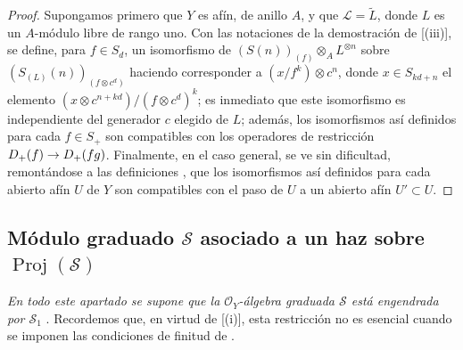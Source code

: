 \documentclass[oneside,10pt]{amsart}
\makeatletter
\newcommand{\ega@arrow}[2]{\mathchoice{#1}{#2}{#2}{#2}}
\renewcommand{\to}{\ega@arrow{\longrightarrow}{\rightarrow}}
\let\EGAOriginalLabel\label
\renewcommand{\label}[1]{\phantomsection\EGAOriginalLabel{#1}}
\makeatother
\begin{document}
\begin{proof}
Supongamos primero que $Y$ es afín, de anillo $A$, y que $\mathcal{L}=\widetilde{L}$, donde $L$ es un $A$-módulo libre de rango uno.
Con las notaciones de la demostración de [(iii)], se define, para $f\in S_d$, un isomorfismo de $(S(n))_{(f)}\otimes_A L^{\otimes n}$ sobre $(S_{(L)}(n))_{(f\otimes c^d)}$ haciendo corresponder a $(x/f^k)\otimes c^n$, donde $x\in S_{kd+n}$ el elemento $(x\otimes c^{n+kd})/(f\otimes c^d)^k$; es inmediato que este isomorfismo es independiente del generador $c$ elegido de $L$; además, los isomorfismos así definidos para cada $f\in S_+$ son compatibles con los operadores de restricción $D_+(f)\to D_+(fg)$.
Finalmente, en el caso general, se ve sin dificultad, remontándose a las definiciones , que los isomorfismos así definidos para cada abierto afín $U$ de $Y$ son compatibles con el paso de $U$ a un abierto afín $U'\subset U$.
\end{proof}

\subsection{Módulo graduado $\mathcal{S}$ asociado a un haz sobre $\operatorname{Proj}(\mathcal{S})$}
\label{subsection:II.3.3-fr}

\emph{En todo este apartado se supone que la $\mathcal{O}_Y$-álgebra graduada $\mathcal{S}$ está engendrada por $\mathcal{S}_1$} .
Recordemos que, en virtud de [(i)], esta restricción no es esencial cuando se imponen las condiciones de finitud de .
\end{document}
